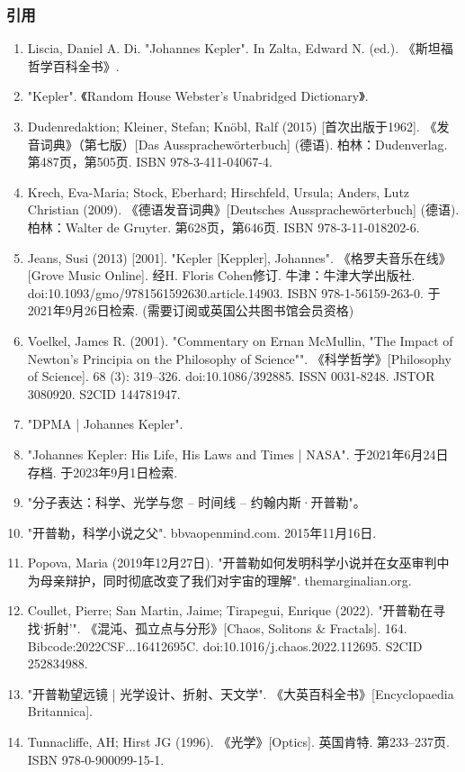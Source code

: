 \subsubsection{引用}
\begin{enumerate}
\item Liscia, Daniel A. Di. "Johannes Kepler". In Zalta, Edward N. (ed.). 《斯坦福哲学百科全书》.
\item "Kepler". 《Random House Webster's Unabridged Dictionary》.
\item Dudenredaktion; Kleiner, Stefan; Knöbl, Ralf (2015) [首次出版于1962]. 《发音词典》（第七版）[Das Aussprachewörterbuch] (德语). 柏林：Dudenverlag. 第487页，第505页. ISBN 978-3-411-04067-4.
\item Krech, Eva-Maria; Stock, Eberhard; Hirschfeld, Ursula; Anders, Lutz Christian (2009). 《德语发音词典》[Deutsches Aussprachewörterbuch] (德语). 柏林：Walter de Gruyter. 第628页，第646页. ISBN 978-3-11-018202-6.
\item Jeans, Susi (2013) [2001]. "Kepler [Keppler], Johannes". 《格罗夫音乐在线》[Grove Music Online]. 经H. Floris Cohen修订. 牛津：牛津大学出版社. doi:10.1093/gmo/9781561592630.article.14903. ISBN 978-1-56159-263-0. 于2021年9月26日检索. (需要订阅或英国公共图书馆会员资格)
\item Voelkel, James R. (2001). "Commentary on Ernan McMullin, "The Impact of Newton's Principia on the Philosophy of Science"". 《科学哲学》[Philosophy of Science]. 68 (3): 319–326. doi:10.1086/392885. ISSN 0031-8248. JSTOR 3080920. S2CID 144781947.
\item "DPMA | Johannes Kepler".
\item  "Johannes Kepler: His Life, His Laws and Times | NASA". 于2021年6月24日存档. 于2023年9月1日检索.
\item "分子表达：科学、光学与您 – 时间线 – 约翰内斯·开普勒"。
\item "开普勒，科学小说之父". bbvaopenmind.com. 2015年11月16日.
\item Popova, Maria (2019年12月27日). "开普勒如何发明科学小说并在女巫审判中为母亲辩护，同时彻底改变了我们对宇宙的理解". themarginalian.org.
\item Coullet, Pierre; San Martin, Jaime; Tirapegui, Enrique (2022). "开普勒在寻找‘折射’". 《混沌、孤立点与分形》[Chaos, Solitons & Fractals]. 164. Bibcode:2022CSF...16412695C. doi:10.1016/j.chaos.2022.112695. S2CID 252834988.
\item "开普勒望远镜 | 光学设计、折射、天文学". 《大英百科全书》[Encyclopaedia Britannica].
\item Tunnacliffe, AH; Hirst JG (1996). 《光学》[Optics]. 英国肯特. 第233–237页. ISBN 978-0-900099-15-1.

\end{enumerate}
